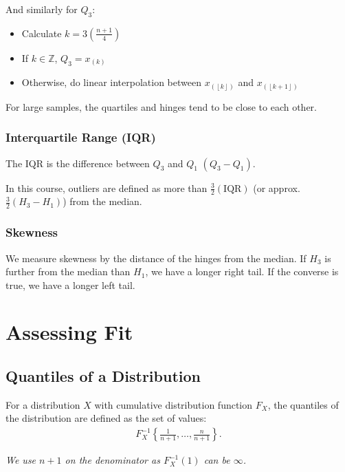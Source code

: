\documentclass[a4paper, 12pt, twoside]{article}
\def\lf{\left\lfloor}
\def\rf{\right\rfloor}
\begin{document}
And similarly for $Q_3$:

\begin{itemize}
    \item Calculate $k = 3\left(\frac{n + 1}{4}\right)$
    \item If $k \in \mathbb{Z}$, $Q_3 = x_{(k)}$
    \item Otherwise, do linear interpolation between $x_{(\lf k\rf)}$
          and $x_{(\lf k+1\rf)}$
\end{itemize}

For large samples, the quartiles and hinges tend to be close to each
other.

\subsubsection{Interquartile Range (IQR)}

The IQR is the difference between $Q_3$ and $Q_1$ $(Q_3 - Q_1)$.

In this course, outliers are defined as more than
$\frac{3}{2}(\text{IQR})$ (or approx. $\frac{3}{2}(H_3 - H_1)$) from the median.

\subsubsection{Skewness}

We measure skewness by the distance of the hinges from the median.
If $H_3$ is further from the median than $H_1$, we have a longer
right tail. If the converse is true, we have a longer left tail.

\section{Assessing Fit}

\subsection{Quantiles of a Distribution}

For a distribution $X$ with cumulative distribution function
$F_X$, the quantiles of the distribution are defined as the set
of values:
\begin{align*}
    F_X^{-1} \left\{ \frac{1}{n+1}, \ldots, \frac{n}{n+1} \right\}.
\end{align*}

\textit{We use $n + 1$ on the denominator as $F_X^{-1}(1)$ can be
$\infty$.}

\vspace{\baselineskip}
\end{document}
